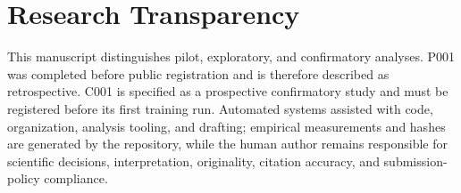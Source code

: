 \section{Research Transparency}
This manuscript distinguishes pilot, exploratory, and confirmatory analyses. P001 was
completed before public registration and is therefore described as retrospective. C001 is
specified as a prospective confirmatory study and must be registered before its first
training run. Automated systems assisted with code, organization, analysis tooling, and
drafting; empirical measurements and hashes are generated by the repository, while the
human author remains responsible for scientific decisions, interpretation, originality,
citation accuracy, and submission-policy compliance.
